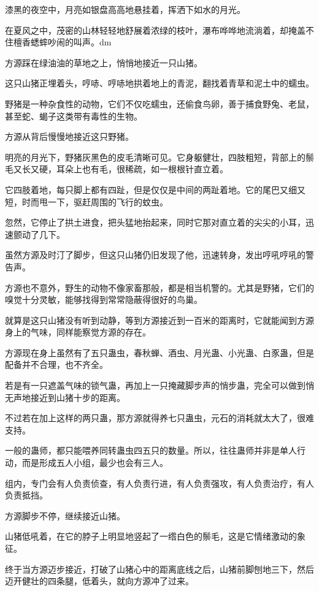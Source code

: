 
\begin{this_body}

漆黑的夜空中，月亮如银盘高高地悬挂着，挥洒下如水的月光。

在夏风之中，茂密的山林轻轻地舒展着浓绿的枝叶，瀑布哗哗地流淌着，却掩盖不住檀香蟋蟀吵闹的叫声。dm

方源踩在绿油油的草地之上，悄悄地接近一只山猪。

这只山猪正埋着头，哼哧、哼哧地拱着地上的青泥，翻找着青草和泥土中的蠕虫。

野猪是一种杂食性的动物，它们不仅吃蠕虫，还偷食鸟卵，善于捕食野兔、老鼠，甚至蛇、蝎子这类带有毒性的生物。

方源从背后慢慢地接近这只野猪。

明亮的月光下，野猪灰黑色的皮毛清晰可见。它身躯健壮，四肢粗短，背部上的鬃毛又长又硬，耳朵上也有毛，很稀疏，如一根根针直立着。

它四肢着地，每只脚上都有四趾，但是仅仅是中间的两趾着地。它的尾巴又细又短，时而甩一下，驱赶周围的飞行的蚊虫。

忽然，它停止了拱土进食，把头猛地抬起来，同时它那对直立着的尖尖的小耳，迅速颤动了几下。

虽然方源及时汀了脚步，但这只山猪仍旧发现了他，迅速转身，发出哼吼哼吼的警告声。

方源也不意外，野生的动物不像家畜那般，都是相当机警的。尤其是野猪，它们的嗅觉十分灵敏，能够找得到常常隐蔽得很好的鸟巢。

就算是这只山猪没有听到动静，等到方源接近到一百米的距离时，它就能闻到方源身上的气味，同样能察觉方源的存在。

方源现在身上虽然有了五只蛊虫，春秋蝉、酒虫、月光蛊、小光蛊、白豕蛊，但是配备并不合理，也不齐全。

若是有一只遮盖气味的锁气蛊，再加上一只掩藏脚步声的悄步蛊，完全可以做到悄无声地接近到山猪十步的距离。

不过若在加上这样的两只蛊，那方源就得养七只蛊虫，元石的消耗就太大了，很难支持。

一般的蛊师，都只能喂养同转蛊虫四五只的数量。所以，往往蛊师并非是单人行动，而是形成五人小组，最少也会有三人。

组内，专门会有人负责侦查，有人负责行进，有人负责强攻，有人负责治疗，有人负责抵挡。

方源脚步不停，继续接近山猪。

山猪低吼着，在它的脖子上明显地竖起了一绺白色的鬃毛，这是它情绪激动的象征。

终于当方源迈步接近，打破了山猪心中的距离底线之后，山猪前脚刨地三下，然后迈开健壮的四条腿，低着头，就向方源冲了过来。


\end{this_body}
